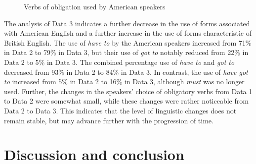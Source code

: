 \documentclass[output=paper,colorlinks,citecolor=brown]{langscibook}
\begin{document}
\begin{figure}
\caption{Verbs of obligation used by American speakers}
\label{fig:hirano:4}
\end{figure}

The analysis of Data 3 indicates a further decrease in the use of forms associated with American English and a further increase in the use of forms characteristic of British English. The use of \textit{have to} by the American speakers increased from 71\% in Data 2 to 79\% in Data 3, but their use of \textit{got to} notably reduced from 22\% in Data 2 to 5\% in Data 3. The combined percentage use of \textit{have to} and \textit{got to} decreased from 93\% in Data 2 to 84\% in Data 3. In contrast, the use of \textit{have got to} increased from 5\% in Data 2 to 16\% in Data 3, although \textit{must} was no longer used. Further, the changes in the speakers’ choice of obligatory verbs from Data 1 to Data 2 were somewhat small, while these changes were rather noticeable from Data 2 to Data 3. This indicates that the level of linguistic changes does not remain stable, but may advance further with the progression of time. 





\section{Discussion and conclusion} %
\label{sec:hirano:6}
\end{document}
